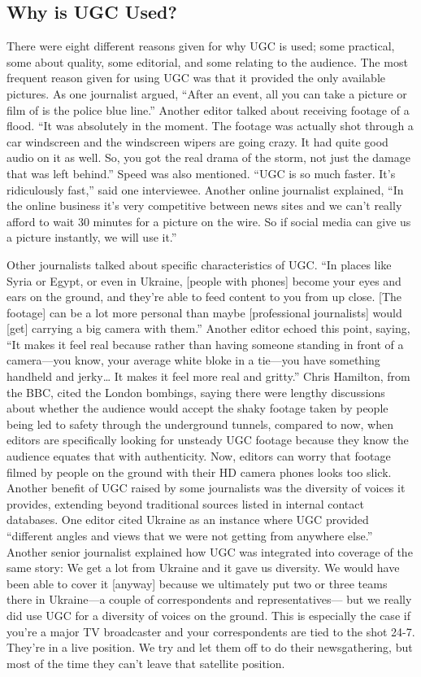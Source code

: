 \begin{enumerate}
\section{Why is UGC Used?}
There were eight different reasons given for why UGC is used; some practical,
some about quality, some editorial, and some relating to the audience.
The most frequent reason given for using UGC was that it provided the
only available pictures. As one journalist argued, ``After an event, all you can
take a picture or film of is the police blue line.'' Another editor talked about
receiving footage of a flood. ``It was absolutely in the moment. The footage
was actually shot through a car windscreen and the windscreen wipers are
going crazy. It had quite good audio on it as well. So, you got the real drama
of the storm, not just the damage that was left behind.''
Speed was also mentioned. ``UGC is so much faster. It's ridiculously fast,''
said one interviewee. Another online journalist explained, ``In the online
business it's very competitive between news sites and we can't really afford
to wait 30 minutes for a picture on the wire. So if social media can give us a
picture instantly, we will use it.''

Other journalists talked about specific characteristics of UGC. ``In places
like Syria or Egypt, or even in Ukraine, [people with phones] become your
eyes and ears on the ground, and they're able to feed content to you from
up close. [The footage] can be a lot more personal than maybe [professional
journalists] would [get] carrying a big camera with them.'' Another editor
echoed this point, saying, ``It makes it feel real because rather than having
someone standing in front of a camera—you know, your average white bloke
in a tie—you have something handheld and jerky… It makes it feel more
real and gritty.'' Chris Hamilton, from the BBC, cited the London bombings,
saying there were lengthy discussions about whether the audience would
accept the shaky footage taken by people being led to safety through the
underground tunnels, compared to now, when editors are specifically looking
for unsteady UGC footage because they know the audience equates that
with authenticity. Now, editors can worry that footage filmed by people on
the ground with their HD camera phones looks too slick.
Another benefit of UGC raised by some journalists was the diversity of
voices it provides, extending beyond traditional sources listed in internal
contact databases. One editor cited Ukraine as an instance where UGC provided
``different angles and views that we were not getting from anywhere
else.'' Another senior journalist explained how UGC was integrated into
coverage of the same story:
We get a lot from Ukraine and it gave us diversity. We would have
been able to cover it [anyway] because we ultimately put two or three
teams there in Ukraine—a couple of correspondents and representatives—
but we really did use UGC for a diversity of voices on the
ground. This is especially the case if you're a major TV broadcaster
and your correspondents are tied to the shot 24-7. They're in a live
position. We try and let them off to do their newsgathering, but most
of the time they can't leave that satellite position.


\end{enumerate}

